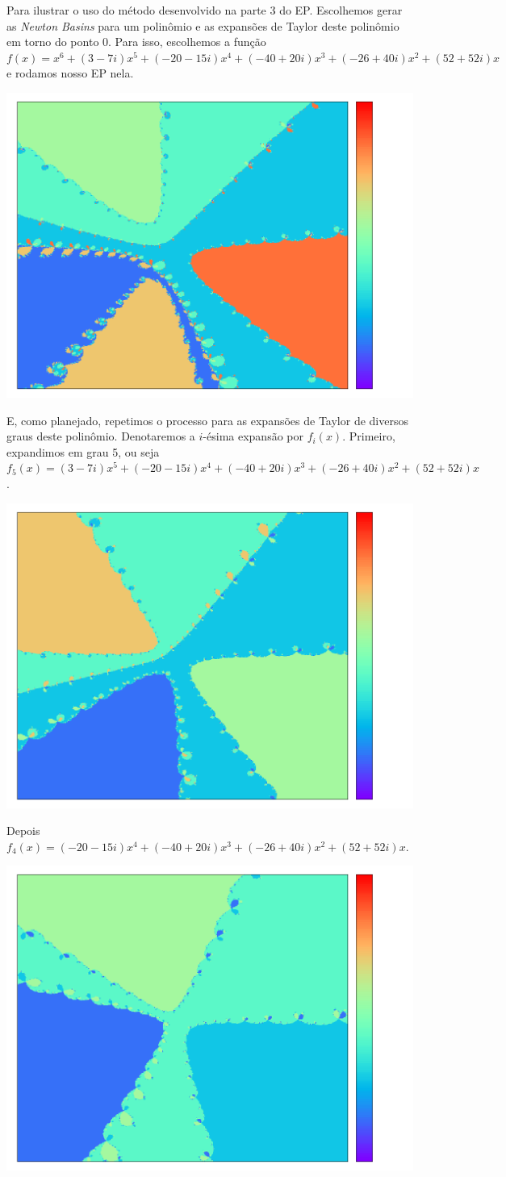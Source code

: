 \documentclass{article}
\begin{document}
Para ilustrar o uso do método desenvolvido na parte 3 do EP. Escolhemos gerar as \textit{Newton Basins} para um polinômio e as expansões de Taylor deste polinômio em torno do ponto 0. Para isso, escolhemos a função $f(x) = x^6 + (3-7i)x^5 + (-20-15i)x^4 + (-40+20i)x^3 + (-26+40i)x^2 + (52+52i)x$ e rodamos nosso EP nela.  
\begin{center}\includegraphics[width=0.75\columnwidth]{original} \end{center}
E, como planejado, repetimos o processo para as expansões de Taylor de diversos graus deste polinômio. Denotaremos a $i$-ésima expansão por $f_i(x)$. Primeiro, expandimos em grau 5, ou seja $f_5(x) = (3-7i)x^5 + (-20-15i)x^4 + (-40+20i)x^3 + (-26+40i)x^2 + (52+52i)x$.  
\begin{center}\includegraphics[width=0.75\columnwidth]{expand_5} \end{center}
Depois $f_4(x) = (-20-15i)x^4 + (-40+20i)x^3 + (-26+40i)x^2 + (52+52i)x$.  
\begin{center}\includegraphics[width=0.75\columnwidth]{expand_4} \end{center}
\end{document}
